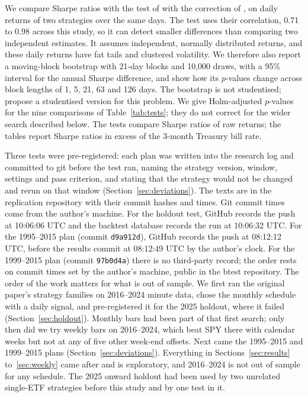 \documentclass[11pt]{article}
\begin{document}
We compare Sharpe ratios with the test of \citet{jobson1981} with the correction of
\citet{memmel2003}, on daily returns of two strategies over the same days. The test uses their
correlation, 0.71 to 0.98 across this study, so it can detect smaller differences than
comparing two independent estimates. It assumes independent, normally distributed returns, and
these daily returns have fat tails and clustered volatility. We therefore also report a
moving-block bootstrap \citep{kunsch1989} with 21-day blocks and 10,000 draws, with a 95\%
interval for the annual Sharpe difference, and show how its $p$-values change across block
lengths of 1, 5, 21, 63 and 126 days. The bootstrap is not studentised; \citet{ledoit2008} propose a studentised version for
this problem. We give Holm-adjusted $p$-values for the nine comparisons of
Table~\ref{tab:tests}; they do not correct for the wider search described below. The tests compare Sharpe ratios of raw returns; the tables report Sharpe
ratios in excess of the 3-month Treasury bill rate.

Three tests were pre-registered: each plan was written into the research log and committed to
git before the test ran, naming the strategy version, window, settings and pass criterion, and
stating that the strategy would not be changed and rerun on that window
(Section~\ref{sec:deviations}). The texts are in the replication repository with their commit
hashes and times. Git commit times come from the author's machine. For the holdout test, GitHub
records the push at 10:06:06 UTC and the backtest database records the run at 10:06:32 UTC. For
the 1995--2015 plan (commit \texttt{d9a912d}), GitHub records the push at 08:12:12 UTC, before
the results commit at 08:12:49 UTC by the author's clock. For the 1999--2015 plan (commit
\texttt{97b0d4a}) there is no third-party record; the order rests on commit times set by the
author's machine, public in the btest repository. The order of the work matters for what is out of
sample. We first ran the original paper's strategy families on 2016--2024 minute data, chose
the monthly schedule with a daily signal, and pre-registered it for the 2025 holdout, where it
failed (Section~\ref{sec:holdout}). Monthly bars had been part of that first search; only then did we try weekly bars on
2016--2024, which beat SPY there with calendar weeks but not at any of five other week-end
offsets.
Next came the 1995--2015 and 1999--2015 plans (Section~\ref{sec:deviations}). Everything in
Sections~\ref{sec:results} to~\ref{sec:weekly} came after and is exploratory, and 2016--2024 is
not out of sample for any schedule. The 2025 onward holdout had been used by two unrelated
single-ETF strategies before this study and by one test in it.
\end{document}
